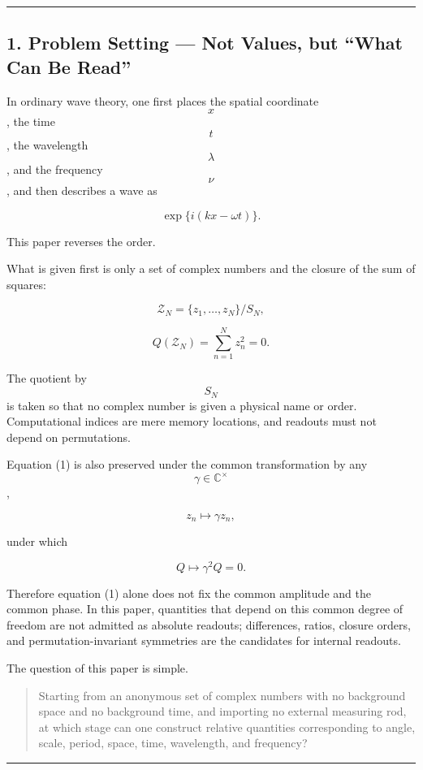 \documentclass[
  a4paper,
]{article}
\begin{document}
\begin{center}\rule{0.5\linewidth}{0.5pt}\end{center}

\subsection{1. Problem Setting --- Not Values, but ``What Can Be
Read''}\label{problem-setting-not-values-but-what-can-be-read}

In ordinary wave theory, one first places the spatial coordinate \[x\],
the time \[t\], the wavelength \[\lambda\], and the frequency \[\nu\],
and then describes a wave as

\[
\exp\{i(kx-\omega t)\}.
\]

This paper reverses the order.

What is given first is only a set of complex numbers and the closure of
the sum of squares:

\[
\mathcal Z_N
=
\{z_1,\ldots,z_N\}/S_N,
\]

\[
Q(\mathcal Z_N)
=
\sum_{n=1}^{N}z_n^2
=0.
\tag{1}
\]

The quotient by \[S_N\] is taken so that no complex number is given a
physical name or order. Computational indices are mere memory locations,
and readouts must not depend on permutations.

Equation (1) is also preserved under the common transformation by any
\[\gamma\in\mathbb C^\times\],

\[
z_n\mapsto \gamma z_n,
\]

under which

\[
Q\mapsto \gamma^2Q=0.
\]

Therefore equation (1) alone does not fix the common amplitude and the
common phase. In this paper, quantities that depend on this common
degree of freedom are not admitted as absolute readouts; differences,
ratios, closure orders, and permutation-invariant symmetries are the
candidates for internal readouts.

The question of this paper is simple.

\begin{quote}
Starting from an anonymous set of complex numbers with no background
space and no background time, and importing no external measuring rod,
at which stage can one construct relative quantities corresponding to
angle, scale, period, space, time, wavelength, and frequency?
\end{quote}

\begin{center}\rule{0.5\linewidth}{0.5pt}\end{center}
\end{document}
